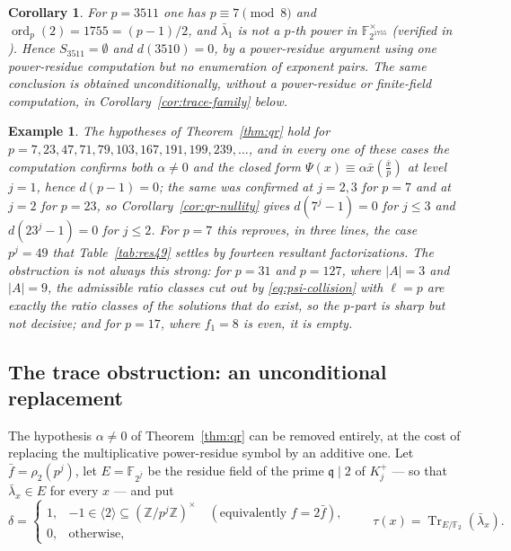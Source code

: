 \documentclass[a4paper]{article}
\newtheorem{corollary}[theorem]{Corollary}
\newtheorem{example}[theorem]{Example}
\newcommand{\F}{\mathbb{F}}
\newcommand{\Z}{\mathbb{Z}}
\newcommand{\ord}[2][]{\operatorname{ord}_{#1}\!\left(#2\right)}
\newcommand{\abs}[1]{\left|#1\right|}
\DeclareMathOperator{\Tr}{Tr}
\begin{document}
\begin{corollary}\label{cor:3511-level1}
	For $p=3511$ one has $p\equiv7\pmod8$ and $\ord[p]{2}=1755=(p-1)/2$,
	and $\bar\lambda_1$ is not a $p$-th power in $\F_{2^{1755}}^{\times}$
	(verified in ).
	Hence $S_{3511}=\emptyset$ and $d(3510)=0$, by a power-residue argument
	using one power-residue computation but no enumeration of exponent pairs.
	The same conclusion is obtained unconditionally, without a
	power-residue or finite-field computation, in
	Corollary~\ref{cor:trace-family} below.
\end{corollary}

\begin{example}\label{ex:qr-family}
	The hypotheses of Theorem~\ref{thm:qr} hold for
	$p=7,23,47,71,79,103,167,191,199,239,\ldots$, and in every one of these
	cases the computation confirms both $\alpha\ne0$ and the closed form
	$\Psi(x)\equiv\alpha\bar x\left(\frac{\bar x}{p}\right)$ at level
	$j=1$, hence $d(p-1)=0$; the same was confirmed at $j=2,3$ for $p=7$
	and at $j=2$ for $p=23$, so Corollary~\ref{cor:qr-nullity} gives
	$d(7^{j}-1)=0$ for $j\leq3$ and $d(23^{j}-1)=0$ for $j\leq2$.
	For $p=7$ this reproves, in three lines, the case
	$p^{j}=49$ that Table~\ref{tab:res49} settles by fourteen resultant
	factorizations.
	The obstruction is not always this strong: for $p=31$ and $p=127$,
	where $\abs{A}=3$ and $\abs{A}=9$, the admissible ratio classes cut
	out by \eqref{eq:psi-collision} with $\ell=p$ are exactly the ratio
	classes of the solutions that do exist, so the $p$-part is sharp but
	not decisive; and for $p=17$, where $f_1=8$ is even, it is empty.
\end{example}

\subsection{The trace obstruction: an unconditional replacement}
\label{sec:traceobs}

The hypothesis $\alpha\ne0$ of Theorem~\ref{thm:qr} can be removed
entirely, at the cost of replacing the multiplicative power-residue symbol
by an additive one.  Let $\bar f=\rho_2(p^{j})$, let $E=\F_{2^{\bar f}}$ be
the residue field of the prime $\mathfrak q\mid2$ of $K_j^{+}$ --- so that
$\bar\lambda_x\in E$ for every $x$ --- and put
\[
	\delta=
	\begin{cases}
		1,&-1\in\langle2\rangle\subseteq(\Z/p^{j}\Z)^{\times}
		\quad(\text{equivalently }f=2\bar f),\\
		0,&\text{otherwise},
	\end{cases}
	\qquad
	\tau(x)=\Tr_{E/\F_2}\!\left(\bar\lambda_x\right).
\]
\end{document}

